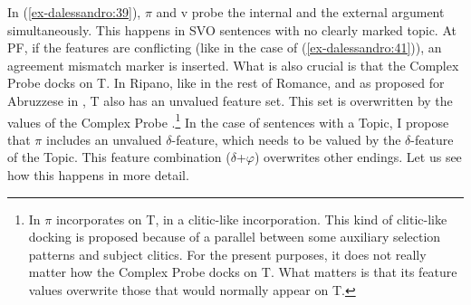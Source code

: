 \documentclass[output=paper
,modfonts
,nonflat]{langsci/langscibook}
\begin{document}
\begin{figure}[!h]
\begin{exe}
\end{exe} \vspace{-0.6cm}
\end{figure}
\noindent 
In (\ref{ex-dalessandro:39}), $\pi $ and v probe the internal and the external argument simultaneously. This happens in SVO sentences with no clearly marked topic. At PF, if the features are conflicting (like in the case of (\ref{ex-dalessandro:41})), an agreement mismatch marker is inserted. What is also crucial is that the Complex Probe docks on T. In Ripano, like in the rest of Romance, and as proposed for Abruzzese in \citet{D`Alessandro_Roberts2010}, T also has an unvalued feature set. This set is overwritten by the values of the Complex Probe .\footnote{
In \citet{D`Alessandro2017} $\pi $ incorporates on T, in a clitic-like incorporation. This kind of clitic-like docking is proposed because of a parallel between some auxiliary selection patterns and subject clitics. For the present purposes, it does not really matter how the Complex Probe docks on T. What matters is that its feature values overwrite those that would normally appear on T.} 
In the case of sentences with a Topic, I propose that $\pi $ includes an unvalued $\delta $-feature, which needs to be valued by the $\delta $-feature of the Topic. This feature combination ($\delta $+$\varphi $) overwrites other endings. Let us see how this happens in more detail.
\end{document}
